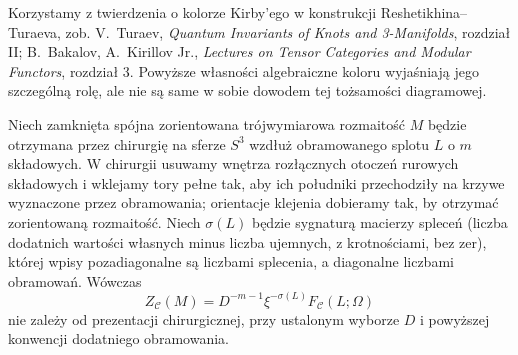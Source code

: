Korzystamy z twierdzenia o kolorze Kirby'ego w konstrukcji Reshetikhina--Turaeva, zob. V.~Turaev, \emph{Quantum Invariants of Knots and 3-Manifolds}, rozdział II; B.~Bakalov, A.~Kirillov Jr., \emph{Lectures on Tensor Categories and Modular Functors}, rozdział 3. Powyższe własności algebraiczne koloru wyjaśniają jego szczególną rolę, ale nie są same w sobie dowodem tej tożsamości diagramowej.

\begin{twierdzenie}\label{cat:thm:tf-rt-surgery}
Niech zamknięta spójna zorientowana trójwymiarowa rozmaitość $M$ będzie otrzymana przez chirurgię na sferze $S^3$ wzdłuż obramowanego splotu $L$ o $m$ składowych. W chirurgii usuwamy wnętrza rozłącznych otoczeń rurowych składowych i wklejamy tory pełne tak, aby ich południki przechodziły na krzywe wyznaczone przez obramowania; orientacje klejenia dobieramy tak, by otrzymać zorientowaną rozmaitość. Niech $\sigma(L)$ będzie sygnaturą macierzy spleceń (liczba dodatnich wartości własnych minus liczba ujemnych, z krotnościami, bez zer), której wpisy pozadiagonalne są liczbami splecenia, a diagonalne liczbami obramowań. Wówczas
\begin{equation}\label{cat:eq:tf-rt-surgery}
 Z_{\mathcal C}(M)=D^{-m-1}\xi^{-\sigma(L)}F_{\mathcal C}(L;\Omega)
\end{equation}
nie zależy od prezentacji chirurgicznej, przy ustalonym wyborze $D$ i powyższej konwencji dodatniego obramowania.
\end{twierdzenie}

